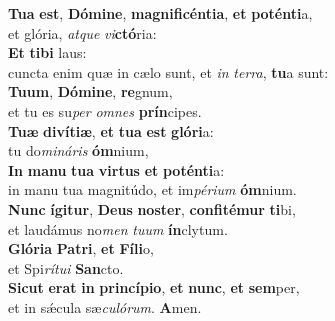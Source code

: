 \evenverse \textbf{Tu}\textbf{a} \textbf{est}, \textbf{Dó}\textbf{mi}\textbf{ne}, \textbf{ma}\textbf{gni}\textbf{fi}\textbf{cén}\textbf{ti}\textbf{a}, \textbf{et} \textbf{po}\textbf{tén}\textbf{ti}a,~\*\\
\evenverse et glória, \textit{at}\textit{que} \textit{vi}\textbf{ctó}ria:\\
\oddverse \textbf{Et} \textbf{ti}\textbf{bi} laus:~\*\\
\oddverse cuncta enim quæ in cælo sunt, et \textit{in} \textit{ter}\textit{ra}, \textbf{tu}a sunt:\\
\evenverse \textbf{Tu}\textbf{um}, \textbf{Dó}\textbf{mi}\textbf{ne}, \textbf{re}gnum,~\*\\
\evenverse et tu es su\textit{per} \textit{om}\textit{nes} \textbf{prín}cipes.\\
\oddverse \textbf{Tu}\textbf{æ} \textbf{di}\textbf{ví}\textbf{ti}\textbf{æ}, \textbf{et} \textbf{tu}\textbf{a} \textbf{est} \textbf{gló}\textbf{ri}a:~\*\\
\oddverse tu do\textit{mi}\textit{ná}\textit{ris} \textbf{óm}nium,\\
\evenverse \textbf{In} \textbf{ma}\textbf{nu} \textbf{tu}\textbf{a} \textbf{vir}\textbf{tus} \textbf{et} \textbf{po}\textbf{tén}\textbf{ti}a:~\*\\
\evenverse in manu tua magnitúdo, et im\textit{pé}\textit{ri}\textit{um} \textbf{óm}nium.\\
\oddverse \textbf{Nunc} \textbf{í}\textbf{gi}\textbf{tur}, \textbf{De}\textbf{us} \textbf{no}\textbf{ster}, \textbf{con}\textbf{fi}\textbf{té}\textbf{mur} \textbf{ti}bi,~\*\\
\oddverse et laudámus no\textit{men} \textit{tu}\textit{um} \textbf{ín}clytum.\\
\evenverse \textbf{Gló}\textbf{ri}\textbf{a} \textbf{Pa}\textbf{tri}, \textbf{et} \textbf{Fí}\textbf{li}o,~\*\\
\evenverse et Spi\textit{rí}\textit{tu}\textit{i} \textbf{San}cto.\\
\oddverse \textbf{Si}\textbf{cut} \textbf{e}\textbf{rat} \textbf{in} \textbf{prin}\textbf{cí}\textbf{pi}\textbf{o}, \textbf{et} \textbf{nunc}, \textbf{et} \textbf{sem}per,~\*\\
\oddverse et in sǽcula sæ\textit{cu}\textit{ló}\textit{rum}. \textbf{A}men.\\
